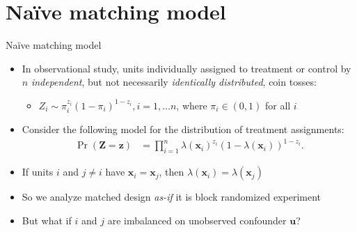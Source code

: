\documentclass[table, xcolor={dvipsnames}, 9pt]{beamer}
\theoremstyle{newstyle}
\begin{document}
\section{Na\"{i}ve matching model}
\begin{frame}{Na\"{i}ve matching model}
\vfill
\begin{itemize} \vfill
\item In observational study, units individually assigned to treatment or control by $n$ \textit{independent}, but not necessarily \textit{identically distributed}, coin tosses: \vfill
\begin{itemize} \vfill
\item $Z_i \sim \pi_i^{z_i} \left(1 - \pi_i\right)^{1 - z_i}, i = 1, \dots n$, where $\pi_i \in (0, 1)$ for all $i$ \vfill
\end{itemize} \vfill
\item  Consider the following model for the distribution of treatment assignments:  \vfill
\begin{align*} 
\Pr\left(\mathbf{Z} = \mathbf{z}\right) & = \prod \limits_{i = 1}^n \lambda\left(\mathbf{x}_i\right)^{z_i} \left(1 - \lambda\left(\mathbf{x}_i\right)\right)^{1 - z_i}.
\end{align*} \vfill
\item  If units $i$ and $j \neq i$ have $\bm{x}_i = \bm{x}_j$, then $\lambda\left(\mathbf{x}_i \right) = \lambda\left(\mathbf{x}_j \right)$ \vfill
\item  So we analyze matched design \textit{as-if} it is block randomized experiment \vfill
\item But what if $i$ and $j$ are imbalanced on unobserved confounder $\bm{u}$? \vfill
\end{itemize} \vfill
\end{frame}
\end{document}
